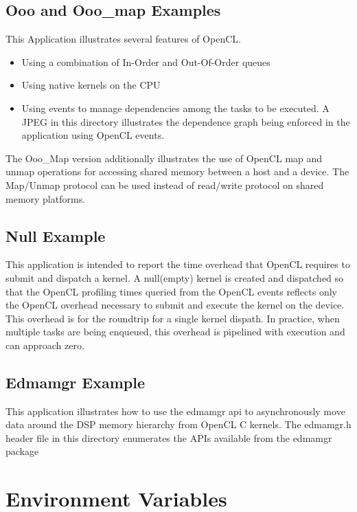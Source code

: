 \documentclass[10pt]{article}
\begin{document}
\subsection{Ooo and Ooo\_map Examples}\label{ooo}
This Application illustrates several features of OpenCL.
\begin{itemize}
\item Using a combination of In-Order and Out-Of-Order queues
\item Using native kernels on the CPU 
\item Using events to manage dependencies among the tasks to be executed.
A JPEG in this directory illustrates the dependence graph being enforced in the
application using OpenCL events.
\end{itemize}

The Ooo\_Map version additionally illustrates the use of OpenCL map and unmap
operations for accessing shared memory between a host and a device.  The 
Map/Unmap protocol can be used instead of read/write protocol on shared memory
platforms.

\subsection{Null Example}
This application is intended to report the time overhead that OpenCL requires
to submit and dispatch a kernel. A null(empty) kernel is created and
dispatched so that the OpenCL profiling times queried from the OpenCL events reflects only the 
OpenCL overhead
necessary to submit and execute the kernel on the device.  This overhead is for the roundtrip for a single kernel dispath.  In practice, when multiple tasks are being enqueued, this overhead is pipelined with execution and can approach zero.

\subsection{Edmamgr Example}\label{edmamgr}
This application illustrates how to use the edmamgr api to asynchronously move 
data around the DSP memory hierarchy from OpenCL C kernels.  The edmamgr.h header file in this directory enumerates the APIs available from the edmamgr package

\newpage
\section{Environment Variables}\label{envvar}
\end{document}
